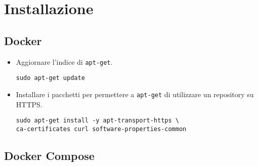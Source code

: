 \chapter{Installazione}
\label{Installazione}
\thispagestyle{empty}

\lstset{language=bash}

\section{Docker}

\begin{itemize}
    \item  
    Aggiornare l'indice di \verb|apt-get|.
    \begin{lstlisting}
sudo apt-get update
    \end{lstlisting}
    
    \item
    Installare i pacchetti per permettere a \verb|apt-get| di utilizzare un repository su HTTPS.
    \begin{lstlisting}
sudo apt-get install -y apt-transport-https \
ca-certificates curl software-properties-common
    \end{lstlisting}
\end{itemize}


\section{Docker Compose}

